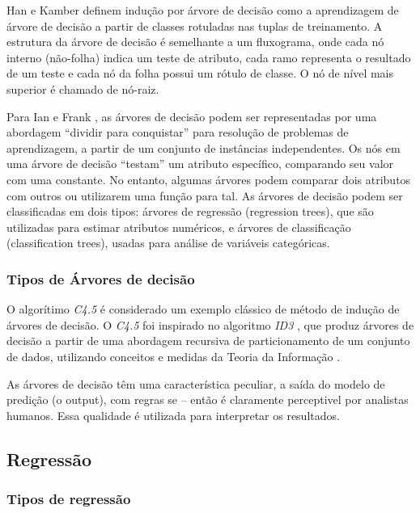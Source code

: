 Han e Kamber \cite{DataMining} definem indução por árvore de decisão como a aprendizagem de árvore de decisão a partir de classes rotuladas nas tuplas de treinamento. 
A estrutura da árvore de decisão é semelhante a um fluxograma, onde cada nó interno (não-folha) indica um teste de atributo, cada ramo representa o resultado de um teste e 
cada nó da folha possui um rótulo de classe. O nó de nível mais superior é chamado de nó-raiz.


Para Ian e Frank \cite{MachineLearning}, as árvores de decisão podem ser representadas por uma abordagem ``dividir para conquistar'' para resolução de problemas de 
aprendizagem, a partir de um conjunto de instâncias independentes. Os nós em uma árvore de decisão ``testam'' um atributo específico, comparando seu valor com uma constante.
No entanto, algumas árvores podem comparar dois atributos com outros ou utilizarem uma função para tal.
As árvores de decisão podem ser classificadas em dois tipos: árvores de regressão (regression trees), que são utilizadas para estimar atributos numéricos, e árvores de 
classificação (classification trees), usadas para análise de variáveis categóricas.

\pagebreak

\subsubsection{Tipos de Árvores de decisão}
O algorítimo \textit{C4.5} é considerado um exemplo clássico de método de indução de árvores de decisão. O \textit{C4.5} \cite{Learning2007} foi inspirado no algoritmo 
\textit{ID3} \cite{Learning1979}, que produz árvores de decisão a partir de uma abordagem recursiva de particionamento de um conjunto de dados, utilizando conceitos e medidas 
da Teoria da Informação \cite{TeoriaInf}.

As árvores de decisão têm uma característica peculiar, a saída do modelo de predição (o output), com regras se -- então é claramente perceptivel por analistas humanos.
Essa qualidade é utilizada para interpretar os resultados.


\subsection{Regressão}

\subsubsection{Tipos de regressão}

